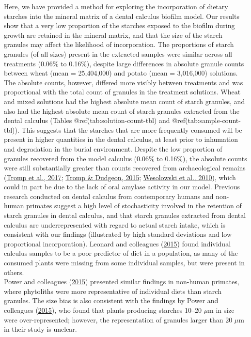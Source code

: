 \documentclass[
  letterpaper,
]{book}
\begin{document}
Here, we have provided a method for exploring the incorporation of
dietary starches into the mineral matrix of a dental calculus biofilm
model. Our results show that a very low proportion of the starches
exposed to the biofilm during growth are retained in the mineral matrix,
and that the size of the starch granules may affect the likelihood of
incorporation. The proportions of starch granules (of all sizes) present
in the extracted samples were similar across all treatments (0.06\% to
0.16\%), despite large differences in absolute granule counts between
wheat (mean = 25,404,000) and potato (mean = 3,016,000) solutions.\\
The absolute counts, however, differed more visibly between treatments
and was proportional with the total count of granules in the treatment
solutions. Wheat and mixed solutions had the highest absolute mean count
of starch granules, and also had the highest absolute mean count of
starch granules extracted from the dental calculus (Tables
@ref(tab:solution-count-tbl) and @ref(tab:sample-count-tbl)). This
suggests that the starches that are more frequently consumed will be
present in higher quantities in the dental calculus, at least prior to
inhumation and degradation in the burial environment. Despite the low
proportion of granules recovered from the model calculus (0.06\% to
0.16\%), the absolute counts were still substantially greater than
counts recovered from archaeological remains
(\protect\hyperlink{ref-trompEDTACalculus2017}{Tromp et al., 2017};
\protect\hyperlink{ref-trompDietaryNondietary2015}{Tromp \& Dudgeon,
2015};
\protect\hyperlink{ref-wesolowskiEvaluatingMicrofossil2010}{Wesolowski
et al., 2010}), which could in part be due to the lack of oral amylase
activity in our model. Previous research conducted on dental calculus
from contemporary humans and non-human primates suggest a high level of
stochasticity involved in the retention of starch granules in dental
calculus, and that starch granules extracted from dental calculus are
underrepresented with regard to actual starch intake, which is
consistent with our findings (illustrated by high standard deviations
and low proportional incorporation). Leonard and colleagues
(\protect\hyperlink{ref-leonardPlantMicroremains2015}{2015}) found
individual calculus samples to be a poor predictor of diet in a
population, as many of the consumed plants were missing from some
individual samples, but were present in others.\\
Power and colleagues
(\protect\hyperlink{ref-powerChimpCalculus2015}{2015}) presented similar
findings in non-human primates, where phytoliths were more
representative of individual diets than starch granules. The size bias
is also consistent with the findings by Power and colleagues
(\protect\hyperlink{ref-powerChimpCalculus2015}{2015}), who found that
plants producing starches 10--20 \(\mu\)m in size were over-represented;
however, the representation of granules larger than 20 \(\mu\)m in their
study is unclear.
\end{document}
